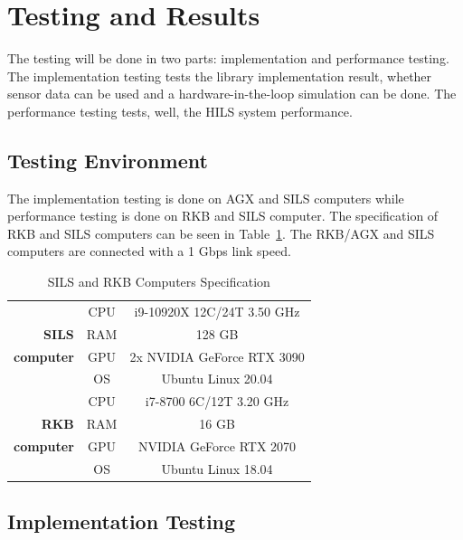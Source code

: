 \section{Testing and Results}

The testing will be done in two parts: implementation and performance testing.
The implementation testing tests the library implementation result, whether
sensor data can be used and a hardware-in-the-loop simulation can be done. The
performance testing tests, well, the HILS system performance.

\subsection{Testing Environment}

The implementation testing is done on AGX and SILS computers while performance
testing is done on RKB and SILS computer. The specification of RKB and SILS
computers can be seen in Table~\ref{tbl-section-6-computers-specs}. The RKB/AGX
and SILS computers are connected with a 1 Gbps link speed.

\begin{table}[htbp]
	\caption{SILS and RKB Computers Specification}
	\label{tbl-section-6-computers-specs}
	\begin{center}
		\begin{tabular}{r c c}
			\toprule
			                  & CPU & i9-10920X 12C/24T 3.50 GHz \\
			\textbf{SILS}     & RAM & 128 GB                     \\
			\textbf{computer} & GPU & 2x NVIDIA GeForce RTX 3090 \\
			                  & OS  & Ubuntu Linux 20.04         \\
			\midrule
			                  & CPU & i7-8700 6C/12T 3.20 GHz    \\
			\textbf{RKB}      & RAM & 16 GB                      \\
			\textbf{computer} & GPU & NVIDIA GeForce RTX 2070    \\
			                  & OS  & Ubuntu Linux 18.04         \\
			\bottomrule
		\end{tabular}
	\end{center}
\end{table}

\subsection{Implementation Testing}\label{section-4-implementation-testing}

